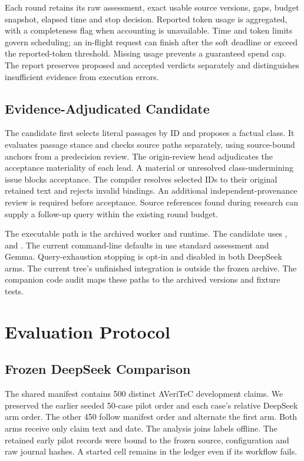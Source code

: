 \documentclass[conference]{IEEEtran}
\begin{document}
Each round retains its raw assessment, exact usable source versions, gaps, budget snapshot, elapsed time and stop decision. Reported token usage is aggregated, with a completeness flag when accounting is unavailable. Time and token limits govern scheduling; an in-flight request can finish after the soft deadline or exceed the reported-token threshold. Missing usage prevents a guaranteed spend cap. The report preserves proposed and accepted verdicts separately and distinguishes insufficient evidence from execution errors.

\subsection{Evidence-Adjudicated Candidate}
The candidate first selects literal passages by ID and proposes a factual class. It evaluates passage stance and checks source paths separately, using source-bound anchors from a predecision review. The origin-review head adjudicates the acceptance materiality of each lead. A material or unresolved class-undermining issue blocks acceptance. The compiler resolves selected IDs to their original retained text and rejects invalid bindings. An additional independent-provenance review is required before acceptance. Source references found during research can supply a follow-up query within the existing round budget.

The executable path is the archived  worker and  runtime. The candidate uses ,  and . The current command-line defaults in  use standard assessment and Gemma. Query-exhaustion stopping is opt-in and disabled in both DeepSeek arms. The current tree's unfinished  integration is outside the frozen archive. The companion code audit maps these paths to the archived versions and fixture tests.

\section{Evaluation Protocol}
\subsection{Frozen DeepSeek Comparison}
The shared manifest contains 500 distinct AVeriTeC development claims. We preserved the earlier seeded 50-case pilot order and each case's relative DeepSeek arm order. The other 450 follow manifest order and alternate the first arm. Both arms receive only claim text and date. The analysis joins labels offline. The retained early pilot records were bound to the frozen source, configuration and raw journal hashes. A started cell remains in the ledger even if its workflow fails.
\end{document}

